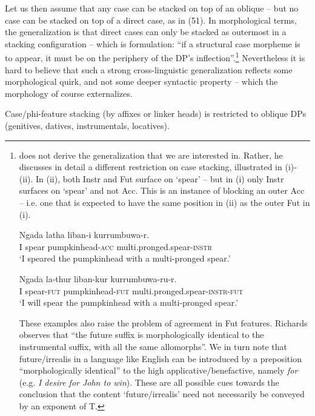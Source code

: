 \documentclass[output=paper]{langsci/langscibook}
\begin{document}
Let us then assume that any case can be stacked on top of an oblique – but no case can be stacked on top of a direct case, as in (51). In morphological terms, the generalization is that direct cases can only be stacked as outermost in a stacking configuration – which is  formulation: “if a structural case morpheme is to appear, it must be on the periphery of the DP’s inflection”.\footnote{\citet{Richards2013} does not derive the generalization that we are interested in. Rather, he discusses in detail a different restriction on case stacking, illustrated in (i)-(ii). In (ii), both Instr and Fut surface on ‘spear’ – but in (i) only Instr surfaces on ‘spear’ and not Acc. This is an instance of blocking an outer Acc – i.e. one that is expected to have the same position in (ii) as the outer Fut in (i).

\ea \gll    Ngada latha   liban-i       kurrumbuwa-r.\\
            I   spear   pumpkinhead-\textsc{acc}   multi.pronged.spear-\textsc{instr}\\
    \glt    ‘I speared the pumpkinhead with a multi-pronged spear.’\\
\z

\ea \gll    Ngada     la-thur     liban-kur     kurrumbuwa-ru-r.\\
            I     spear-\textsc{fut}   pumpkinhead-\textsc{fut}   multi.pronged.spear-\textsc{instr-fut}\\
    \glt    ‘I will spear the pumpkinhead with a multi-pronged spear.’\\
\z

These examples also raise the problem of agreement in Fut features. Richards observes that “the future suffix is morphologically identical to the instrumental suffix, with all the same allomorphs”. We in turn note that future\slash irrealis in a language like English can be introduced by a preposition “morphologically identical” to the high applicative\slash benefactive, namely \textit{for} (e.g. \textit{I desire for John to win}). These are all possible cues towards the conclusion that the content ‘future\slash irrealis’ need not necessarily be conveyed by an exponent of T.}  Nevertheless it is hard to believe that such a strong cross-linguistic generalization reflects some morphological quirk, and not some deeper syntactic property – which the morphology of course externalizes. 

\ea%
    \label{ex:manzini:51}
    Case/phi-feature stacking (by affixes or linker heads) is restricted to oblique DPs (genitives, datives, instrumentals, locatives).  
    \z         
\end{document}
